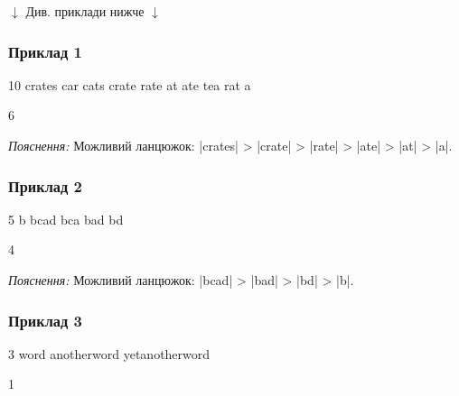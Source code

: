 \documentclass[12pt,a4paper]{article}
\begin{document}
\begin{pagebottomtext}
$\downarrow$ Див. приклади нижче $\downarrow$
\end{pagebottomtext}


\pagebreak


\subsubsection*{Приклад 1}

\textbf{}

\begin{codeblock}
10
crates
car
cats
crate
rate
at
ate
tea
rat
a
\end{codeblock}

\textbf{}

\begin{codeblock}
6
\end{codeblock}

\emph{Пояснення:} Можливий ланцюжок: |crates| > |crate| > |rate| > |ate| > |at| > |a|.


\subsubsection*{Приклад 2}

\textbf{}

\begin{codeblock}
5
b
bcad
bca
bad
bd
\end{codeblock}

\textbf{}

\begin{codeblock}
4
\end{codeblock}

\emph{Пояснення:} Можливий ланцюжок: |bcad| > |bad| > |bd| > |b|.


\subsubsection*{Приклад 3}

\textbf{}

\begin{codeblock}
3
word
anotherword
yetanotherword
\end{codeblock}

\textbf{}

\begin{codeblock}
1
\end{codeblock}
\end{document}
